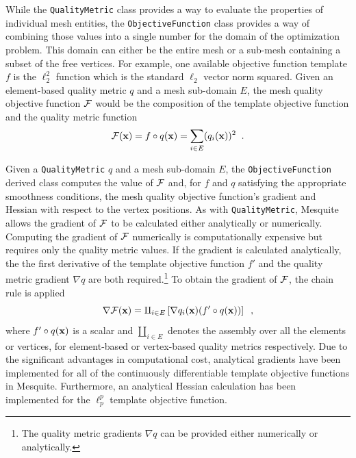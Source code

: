 \documentclass[letter]{report}
\begin{document}
While the \texttt{QualityMetric} class provides a way to evaluate the
properties of individual mesh entities, the \texttt{ObjectiveFunction}
class provides a way of combining those values into a single number
for the domain of the optimization problem.  This domain can either be
the entire mesh or a sub-mesh containing a subset of the free vertices.
For example, one available objective function template $f$ is the $\ell_{2}^2$
function which is the standard $\ell_{2}$ vector norm squared.  
Given an element-based quality metric $q$ and a mesh sub-domain $E$, the mesh 
quality objective function $\cal F$ would be the composition of the template
objective function and the quality metric function 
\begin{equation}
{\cal F}({\bf x}) = f \circ q({\bf x}) = \sum_{i \in E} (q_i({\bf x}))^2 \;\; .
\end{equation}

Given a \texttt{QualityMetric} $q$ and a mesh sub-domain $E$, the
\texttt{ObjectiveFunction} derived class computes the value of $\cal
F$ and, for $f$ and $q$ satisfying the appropriate smoothness
conditions, the mesh quality objective function's gradient and Hessian
with respect to the vertex positions.  As with {\tt QualityMetric},
Mesquite allows the gradient of $\cal F$ to be calculated either
analytically or numerically. Computing the gradient of $\cal F$
numerically is computationally expensive but requires only the quality
metric values.  If the gradient is calculated analytically, the the
first derivative of the template objective function $f'$ and the
quality metric gradient $\nabla q$ are both required.\footnote{The 
quality metric gradients $\nabla q$ can be provided either numerically 
or analytically.}
To obtain the gradient of ${\cal F}$, the chain rule is applied
\begin{equation}
\nabla {\cal F}({\bf x}) = \amalg_{i \in E} \left[ \nabla q_i({\bf x}) 
 (f' \circ q({\bf x}) ) \right] \;\; ,
\end{equation}
where $ f' \circ q({\bf x})$ is a scalar and $\amalg_{i \in E}$ denotes the
assembly over all the elements or vertices, for element-based or 
vertex-based quality metrics respectively.
Due to the significant advantages in computational
cost, analytical gradients have been implemented for all of the
continuously differentiable template objective functions in Mesquite.
Furthermore, an analytical Hessian calculation has been implemented
for the $\ell_p^p$ template objective function.  
\end{document}
